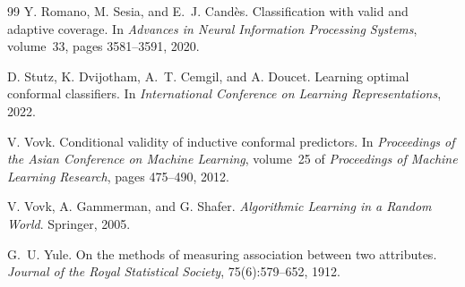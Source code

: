 \documentclass[11pt]{article}
\theoremstyle{definition}
\theoremstyle{definition}
\theoremstyle{remark}
\begin{document}
\begin{thebibliography}{99}
Y. Romano, M. Sesia, and E.~J. Cand\`es.
\newblock Classification with valid and adaptive coverage.
\newblock In \emph{Advances in Neural Information Processing Systems}, volume~33, pages 3581--3591,
2020.

D. Stutz, K. Dvijotham, A.~T. Cemgil, and A. Doucet.
\newblock Learning optimal conformal classifiers.
\newblock In \emph{International Conference on Learning Representations}, 2022.

V. Vovk.
\newblock Conditional validity of inductive conformal predictors.
\newblock In \emph{Proceedings of the Asian Conference on Machine Learning}, volume~25 of
\emph{Proceedings of Machine Learning Research}, pages 475--490, 2012.

V. Vovk, A. Gammerman, and G. Shafer.
\newblock \emph{Algorithmic Learning in a Random World}.
\newblock Springer, 2005.

G.~U. Yule.
\newblock On the methods of measuring association between two attributes.
\newblock \emph{Journal of the Royal Statistical Society}, 75(6):579--652, 1912.

\end{thebibliography}
\end{document}

